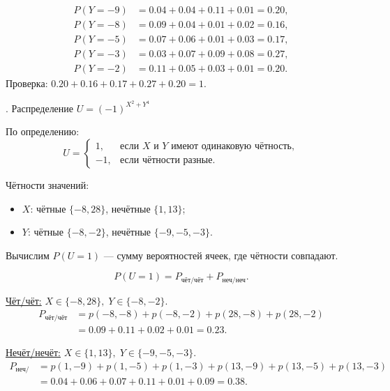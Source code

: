 \documentclass[a4paper,14pt]{extarticle}
\begin{document}
            \[
                \begin{aligned}
                    P(Y=-9) &= 0.04 + 0.04 + 0.11 + 0.01 = 0.20, \\
                    P(Y=-8) &= 0.09 + 0.04 + 0.01 + 0.02 = 0.16, \\
                    P(Y=-5) &= 0.07 + 0.06 + 0.01 + 0.03 = 0.17, \\
                    P(Y=-3) &= 0.03 + 0.07 + 0.09 + 0.08 = 0.27, \\
                    P(Y=-2) &= 0.11 + 0.05 + 0.03 + 0.01 = 0.20.
                \end{aligned}
            \]
            Проверка: $0.20 + 0.16 + 0.17 + 0.27 + 0.20 = 1.$
            
            . Распределение $U = (-1)^{X^2 + Y^4}$
            
            По определению:
            \[
                U =
                \begin{cases}
                    1, & \text{если } X \text{ и } Y \text{ имеют одинаковую чётность},\\
                    -1, & \text{если чётности разные.}
                \end{cases}
            \]
            
            Чётности значений:
            \begin{itemize}
                \item $X$: чётные $\{-8, 28\}$, нечётные $\{1, 13\}$;
                \item $Y$: чётные $\{-8, -2\}$, нечётные $\{-9, -5, -3\}$.
            \end{itemize}
            
            Вычислим $P(U=1)$ — сумму вероятностей ячеек, где чётности совпадают.
            
            \[
                P(U=1) = P_{\text{чёт/чёт}} + P_{\text{неч/неч}}.
            \]
            
            \noindent\underline{Чёт/чёт:} $X \in \{-8, 28\}, \; Y \in \{-8, -2\}$.
            \[
                \begin{aligned}
                    P_{\text{чёт/чёт}} &= p(-8,-8) + p(-8,-2) + p(28,-8) + p(28,-2) \\
                    &= 0.09 + 0.11 + 0.02 + 0.01 = 0.23.
                \end{aligned}
            \]
            
            \noindent\underline{Нечёт/нечёт:} $X \in \{1, 13\}, \; Y \in \{-9, -5, -3\}$.
            \[
                \begin{aligned}
                    P_{\text{неч/неч}} &= p(1,-9) + p(1,-5) + p(1,-3) + p(13,-9) + p(13,-5) + p(13,-3) \\
                    &= 0.04 + 0.06 + 0.07 + 0.11 + 0.01 + 0.09 = 0.38.
                \end{aligned}
            \]
            
\end{document}
